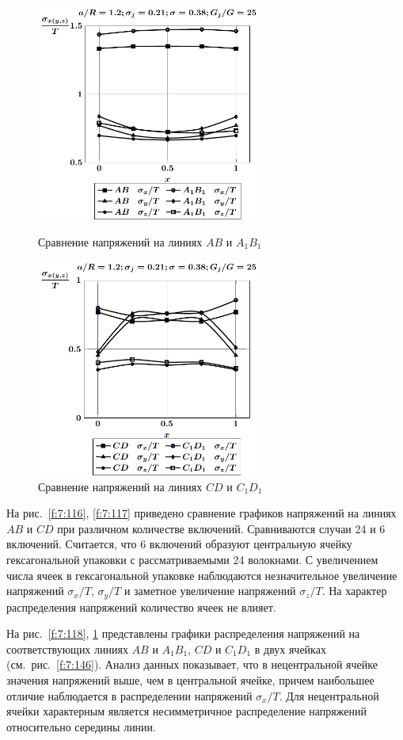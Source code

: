 \begin{figure}[h!]
\centering\footnotesize
\parbox[b]{7.5cm}{\centering\includegraphics[width=7.4cm]{inc24-(ab-a1b1)-a12-h10-r10-g25-z0.pdf}
\caption{Сравнение напряжений на линиях $AB$ и $A_1B_1$
\label{f:7:118}}}\hfil\hfil
\parbox[b]{7.5cm}{\centering\includegraphics[width=7.4cm]{inc24-(cd-c1d1)-a12-h10-r10-g25-z0.pdf}
\caption{Сравнение напряжений на линиях $CD$ и $C_1D_1$
\label{f:7:119}}}
\end{figure}

На рис.~\ref{f:7:116}, \ref{f:7:117} приведено сравнение графиков напряжений на линиях $AB$ и $CD$ при различном количестве включений. Сравниваются случаи 24 и 6 включений. Считается, что 6 включений образуют центральную ячейку гексагональной упаковки с рассматриваемыми 24 волокнами. С увеличением числа ячеек в гексагональной упаковке наблюдаются незначительное увеличение напряжений $\sigma_x/T$, $\sigma_y/T$ и заметное увеличение напряжений $\sigma_z/T$. На характер распределения напряжений количество ячеек не влияет.

На рис.~\ref{f:7:118}, \ref{f:7:119} представлены графики распределения напряжений на соответствующих линиях $AB$ и $A_1B_1$, $CD$ и $C_1D_1$ в двух ячейках (см.~рис.~\ref{f:7:146}). Анализ данных показывает, что в нецентральной ячейке значения напряжений выше, чем в центральной ячейке, причем наибольшее отличие наблюдается в распределении напряжений $\sigma_x/T$. Для нецентральной ячейки характерным является несимметричное распределение напряжений относительно середины линии.

